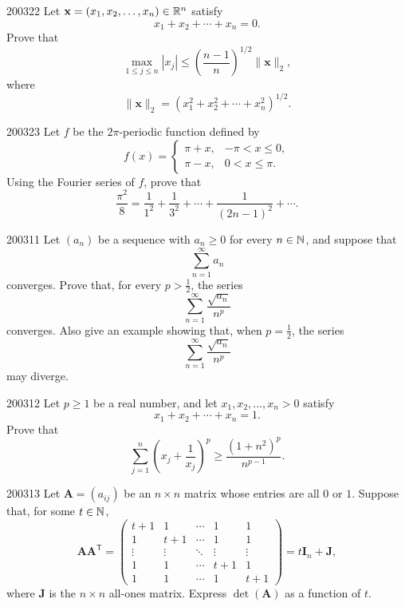 \begin{problem}{2003}{2}{2}
Let $\mathbf x=(x_1, x_2, \dots, x_n)\in\mathbb{R}^n$ satisfy
\[
    x_1+x_2+\cdots+x_n=0.
\]
Prove that
\[
    \max_{1\le j\le n}|x_j|
    \le
    \left(\frac{n-1}{n}\right)^{1/2}\|\mathbf x\|_2,
\]
where
\[
    \|\mathbf x\|_2=(x_1^2+x_2^2+\cdots+x_n^2)^{1/2}.
\]
\end{problem}

\begin{problem}{2003}{2}{3}
Let $f$ be the $2\pi$-periodic function defined by
\[
    f(x)=
    \begin{cases}
        \pi+x, & -\pi<x\le0, \\
        \pi-x, & 0<x\le\pi.
    \end{cases}
\]
Using the Fourier series of $f$, prove that
\[
    \frac{\pi^2}{8}
    =
    \frac1{1^2}+\frac1{3^2}+\cdots+\frac1{(2n-1)^2}+\cdots.
\]
\end{problem}

\begin{problem}{2003}{1}{1}
Let $(a_n)$ be a sequence with $a_n\ge0$ for every $n\in\mathbb{N}$, and suppose that
\[
    \sum_{n=1}^{\infty}a_n
\]
converges. Prove that, for every $p>\tfrac12$, the series
\[
    \sum_{n=1}^{\infty}\frac{\sqrt{a_n}}{n^p}
\]
converges. Also give an example showing that, when $p=\tfrac12$, the series
\[
    \sum_{n=1}^{\infty}\frac{\sqrt{a_n}}{n^p}
\]
may diverge.
\end{problem}

\begin{problem}{2003}{1}{2}
Let $p\ge1$ be a real number, and let $x_1, x_2, \dots, x_n>0$ satisfy
\[
    x_1+x_2+\cdots+x_n=1.
\]
Prove that
\[
    \sum_{j=1}^n\left(x_j+\frac1{x_j}\right)^p
    \ge
    \frac{(1+n^2)^p}{n^{p-1}}.
\]
\end{problem}

\begin{problem}{2003}{1}{3}
Let $\mathbf A=(a_{ij})$ be an $n\times n$ matrix whose entries are all $0$ or $1$. Suppose that, for some $t\in\mathbb{N}$,
\[
    \mathbf A\mathbf A^{\mathsf T}
    =
    \begin{pmatrix}
        t+1 & 1 & \cdots & 1 & 1\\
        1 & t+1 & \cdots & 1 & 1\\
        \vdots & \vdots & \ddots & \vdots & \vdots\\
        1 & 1 & \cdots & t+1 & 1\\
        1 & 1 & \cdots & 1 & t+1
    \end{pmatrix}
    =t\mathbf I_n+\mathbf J,
\]
where $\mathbf J$ is the $n\times n$ all-ones matrix. Express $\det(\mathbf A)$ as a function of $t$.
\end{problem}
